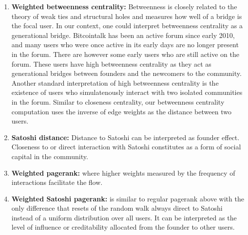 \begin{enumerate}[topsep=0pt,itemsep=-0.5ex,partopsep=1ex,parsep=1ex]
  \item \textbf{Weighted betweenness centrality:} Betweenness is closely related to the theory of weak ties and structural holes and measures how well of a bridge is the focal user. In our context, one could interpret betweenness centrality as a generational bridge. Bitcointalk has been an active forum since early 2010, and many users who were once active in its early days are no longer present in the forum. There are however some early users who are still active on the forum. These users have high betweenness centrality as they act as generational bridges between founders and the newcomers to the community. Another standard interpretation of high betweenness centrality is the existence of users who simulatenously interact with two isolated communities in the forum. Similar to closeness centrality, our betweenness centrality computation uses the inverse of edge weights as the distance between two users.
  \item \textbf{Satoshi distance:} Distance to Satoshi can be interpreted as founder effect. Closeness to or direct interaction with Satoshi constitutes as a form of social capital in the community.
  \item \textbf{Weighted pagerank:} where higher weights measured by the frequency of interactions facilitate the flow.
  \item \textbf{Weighted Satoshi pagerank:} is similar to regular pagerank above with the only difference that resets of the random walk always direct to Satoshi instead of a uniform distribution over all users. It can be interpreted as the level of influence or creditability allocated from the founder to other users.
   
\end{enumerate}
